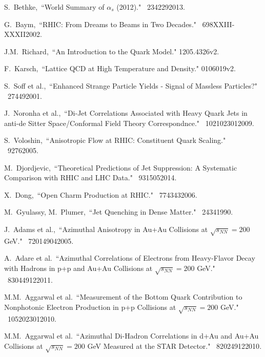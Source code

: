 \begin{thebibliography}{1000}
S.~Bethke,~``World Summary of $\alpha_{s}$ (2012)." \Journal{\NPB} {~234}{229}{2013}.

G.~Baym,~``RHIC: From Dreams to Beams in Two Decades." \Journal{\NPA} {~698}{XXIII-XXXII}{2002}.

J.M.~Richard,~``An Introduction to the Quark Model." \arXiv1205.4326v2.

F.~Karsch,~``Lattice QCD at High Temperature and Density." \arXiv0106019v2.

S.~Soff et al.,~``Enhanced Strange Particle Yields - Signal of Massless Particles?" \Journal{\JPG} {~27}{449}{2001}.

J.~Noronha et al.,~``Di-Jet Correlations Associated with Heavy Quark Jets in anti-de Sitter Space/Conformal Field Theory Correspondnce." \Journal{\PRL} {~102}{102301}{2009}.

S.~Voloshin,~``Anisotropic Flow at RHIC: Constituent Quark Scaling." \textit {}~{} {~9}{276}{2005}.

M.~Djordjevic,~``Theoretical Predictions of Jet Suppression: A Systematic Comparison with RHIC and LHC Data." \Journal{\NPA} {~931}{505}{2014}.

X.~Dong,~``Open Charm Production at RHIC." \Journal{\NPA} {~774}{343}{2006}.

M.~Gyulassy, M.~Plumer,~``Jet Quenching in Dense Matter." \Journal{\PLB} {~243}{4}{1990}.

J.~Adams et al.,~``Azimuthal Anisotropy in Au+Au Collisions at $\sqrt{s_{NN}} = 200$ GeV." \Journal{\PRC} {~72}{014904}{2005}.

A.~Adare et al.~``Azimuthal Correlations of Electrons from Heavy-Flavor Decay with Hadrons in p+p and Au+Au Collisions at $\sqrt{s_{NN}} = 200$ GeV." \Journal{\PRC} {~83}{044912}{2011}.

M.M.~Aggarwal et al.~``Measurement of the Bottom Quark Contribution to Nonphotonic Electron Production in p+p Collisions at $\sqrt{s_{NN}} = 200$ GeV." \Journal{\PRL} {~105}{202301}{2010}.

M.M.~Aggarwal et al.~``Azimuthal Di-Hadron Correlations in d+Au and Au+Au Collisions at $\sqrt{s_{NN}} = 200$ GeV Measured at the STAR Detector." \Journal{\PRC} {~82}{024912}{2010}.


\end{thebibliography}
